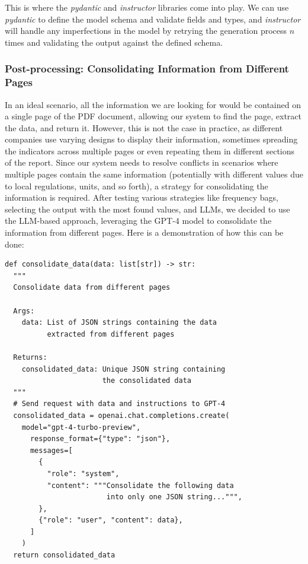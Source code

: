 \documentclass[english, 12pt, a4paper, elec, utf8, a-2b, online]{aaltothesis}
\begin{document}
This is where the \textit{pydantic} and \textit{instructor} libraries come into play.
We can use \textit{pydantic} to define the model schema and validate fields and types, and \textit{instructor} will handle any imperfections in the model by retrying the generation process $n$ times and validating the output against the defined schema.

\subsubsection{Post-processing: Consolidating Information from Different Pages}

In an ideal scenario, all the information we are looking for would be contained on a single page of the \ac{PDF} document, allowing our system to find the page, extract the data, and return it.
However, this is not the case in practice, as different companies use varying designs to display their information, sometimes spreading the indicators across multiple pages or even repeating them in different sections of the report.
Since our system needs to resolve conflicts in scenarios where multiple pages contain the same information (potentially with different values due to local regulations, units, and so forth), a strategy for consolidating the information is required.
After testing various strategies like frequency bags, selecting the output with the most found values, and \ac{LLM}s, we decided to use the \ac{LLM}-based approach, leveraging the \ac{GPT}-4 model to consolidate the information from different pages.
Here is a demonstration of how this can be done:

\begin{verbatim}
def consolidate_data(data: list[str]) -> str:
  """
  Consolidate data from different pages

  Args:
    data: List of JSON strings containing the data
          extracted from different pages

  Returns:
    consolidated_data: Unique JSON string containing
                       the consolidated data
  """
  # Send request with data and instructions to GPT-4
  consolidated_data = openai.chat.completions.create(
    model="gpt-4-turbo-preview",
      response_format={"type": "json"},
      messages=[
        {
          "role": "system",
          "content": """Consolidate the following data
                        into only one JSON string...""",
        },
        {"role": "user", "content": data},
      ]
    )
  return consolidated_data
\end{verbatim}
\end{document}
